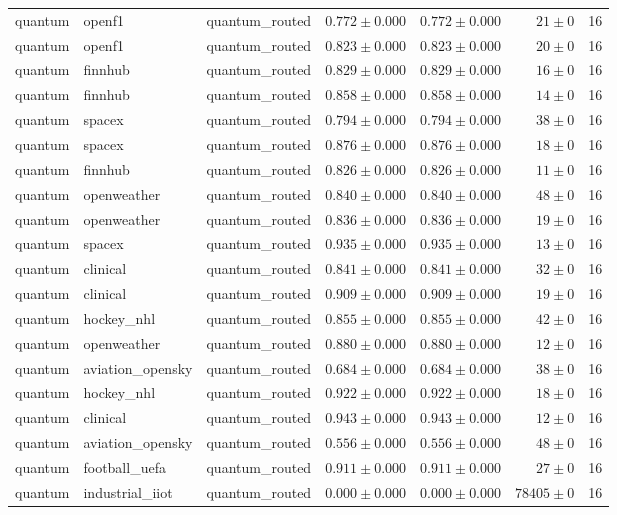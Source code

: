 \begin{table}[htbp]
\begin{tabular}{l l l r r r r}
quantum & openf1 & quantum\_routed & $0.772\pm0.000$ & $0.772\pm0.000$ & $21\pm0$ & 16 \\
quantum & openf1 & quantum\_routed & $0.823\pm0.000$ & $0.823\pm0.000$ & $20\pm0$ & 16 \\
quantum & finnhub & quantum\_routed & $0.829\pm0.000$ & $0.829\pm0.000$ & $16\pm0$ & 16 \\
quantum & finnhub & quantum\_routed & $0.858\pm0.000$ & $0.858\pm0.000$ & $14\pm0$ & 16 \\
quantum & spacex & quantum\_routed & $0.794\pm0.000$ & $0.794\pm0.000$ & $38\pm0$ & 16 \\
quantum & spacex & quantum\_routed & $0.876\pm0.000$ & $0.876\pm0.000$ & $18\pm0$ & 16 \\
quantum & finnhub & quantum\_routed & $0.826\pm0.000$ & $0.826\pm0.000$ & $11\pm0$ & 16 \\
quantum & openweather & quantum\_routed & $0.840\pm0.000$ & $0.840\pm0.000$ & $48\pm0$ & 16 \\
quantum & openweather & quantum\_routed & $0.836\pm0.000$ & $0.836\pm0.000$ & $19\pm0$ & 16 \\
quantum & spacex & quantum\_routed & $0.935\pm0.000$ & $0.935\pm0.000$ & $13\pm0$ & 16 \\
quantum & clinical & quantum\_routed & $0.841\pm0.000$ & $0.841\pm0.000$ & $32\pm0$ & 16 \\
quantum & clinical & quantum\_routed & $0.909\pm0.000$ & $0.909\pm0.000$ & $19\pm0$ & 16 \\
quantum & hockey\_nhl & quantum\_routed & $0.855\pm0.000$ & $0.855\pm0.000$ & $42\pm0$ & 16 \\
quantum & openweather & quantum\_routed & $0.880\pm0.000$ & $0.880\pm0.000$ & $12\pm0$ & 16 \\
quantum & aviation\_opensky & quantum\_routed & $0.684\pm0.000$ & $0.684\pm0.000$ & $38\pm0$ & 16 \\
quantum & hockey\_nhl & quantum\_routed & $0.922\pm0.000$ & $0.922\pm0.000$ & $18\pm0$ & 16 \\
quantum & clinical & quantum\_routed & $0.943\pm0.000$ & $0.943\pm0.000$ & $12\pm0$ & 16 \\
quantum & aviation\_opensky & quantum\_routed & $0.556\pm0.000$ & $0.556\pm0.000$ & $48\pm0$ & 16 \\
quantum & football\_uefa & quantum\_routed & $0.911\pm0.000$ & $0.911\pm0.000$ & $27\pm0$ & 16 \\
quantum & industrial\_iiot & quantum\_routed & $0.000\pm0.000$ & $0.000\pm0.000$ & $78405\pm0$ & 16 \\

\end{tabular}
\end{table}
